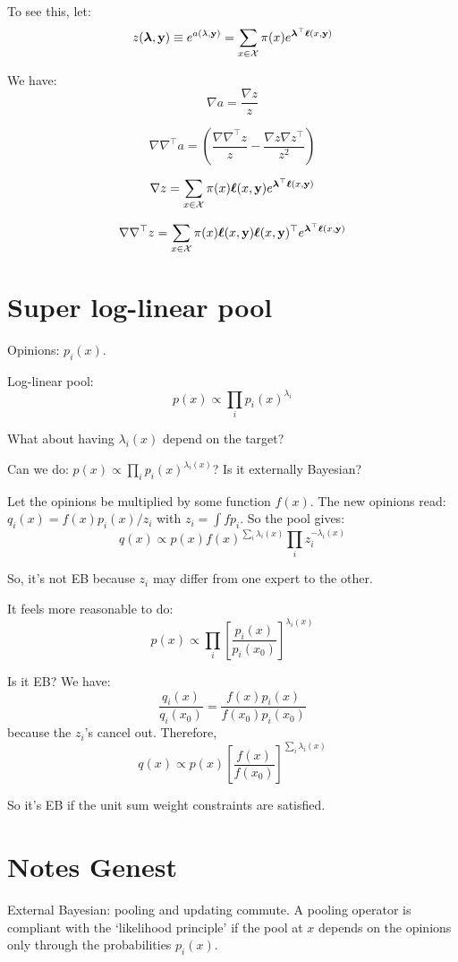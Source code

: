 \documentclass[english]{scrartcl}
\def\y{{\mathbf{y}}}
\newcommand{\blambda}{{\boldsymbol{\lambda}}}
\newcommand{\bell}{{\boldsymbol{\ell}}}
\begin{document}
To see this, let:
$$
z(\blambda,\y) 
\equiv e^{a(\lambda,\y)}  
= \sum_{x\in{\cal X}} \pi(x) e^{\blambda^\top \bell(x,\y)}
$$

We have:
$$
\nabla a = \frac{\nabla z}{z}
$$

$$
\nabla\nabla^\top a 
= \left(
\frac{\nabla \nabla^\top z}{z} 
- \frac{\nabla z \nabla z^\top}{z^2}
\right)
$$

$$
\nabla z 
=
\sum_{x\in{\cal X}} \pi(x) \bell(x,\y)  e^{\blambda^\top \bell(x,\y)}
$$

$$
\nabla \nabla^\top z 
=
\sum_{x\in{\cal X}} \pi(x) \bell(x,\y) \bell(x,\y)^\top e^{\blambda^\top \bell(x,\y)}
$$


\section{Super log-linear pool}
\label{app:super}

Opinions: $p_i(x)$. 

Log-linear pool:
$$
p(x)\propto \prod_i p_i(x)^{\lambda_i}
$$

What about having $\lambda_i(x)$ depend on the target? 

Can we do: $p(x)\propto \prod_i p_i(x)^{\lambda_i(x)}$? Is it externally Bayesian? 

Let the opinions be multiplied by some function $f(x)$. The new opinions read: $q_i(x)=f(x)p_i(x)/z_i$ with $z_i=\int f p_i$. So the pool gives:
$$
q(x) \propto p(x) f(x)^{\sum_i \lambda_i(x)} \prod_i z_i^{-\lambda_i(x)}
$$

So, it's not EB because $z_i$ may differ from one expert to the other.

It feels more reasonable to do:
$$
p(x) \propto \prod_i \left[\frac{p_i(x)}{p_i(x_0)}\right]^{\lambda_i(x)}
$$

Is it EB? We have:
$$
\frac{q_i(x)}{q_i(x_0)} 
= \frac{f(x)p_i(x)}{f(x_0)p_i(x_0)}
$$
because the $z_i$'s cancel out. Therefore,
$$
q(x) \propto p(x) \left[\frac{f(x)}{f(x_0)}\right]^{\sum_i \lambda_i(x)}
$$

So it's EB if the unit sum weight constraints are satisfied.


\section{Notes Genest}

External Bayesian: pooling and updating commute.
A pooling operator is compliant with the `likelihood principle' if the pool at $x$ depends on the opinions only through the probabilities $p_i(x)$.
\end{document}
